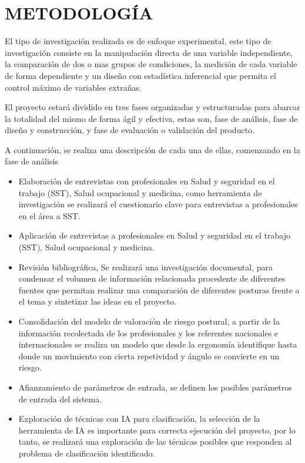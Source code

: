\chapter{METODOLOGÍA}

El tipo de investigación realizada es de enfoque experimental, este tipo de investigación consiste en la manipulación directa de una variable independiente, la comparación de dos o mas grupos de condiciones, la medición de cada variable de forma dependiente y un diseño con estadística inferencial que permita el control máximo de variables extrañas.\parencite{MoroneMetodosCientifica}

El proyecto estará dividido en tres fases organizadas y estructuradas para abarcar la totalidad del mismo de forma ágil y efectiva, estas son, fase de análisis, fase de diseño y construcción, y fase de evaluación o validación del producto.

A continuación, se realiza una descripción de cada una de ellas, comenzando en la fase de análisis 
\begin{itemize}
\item Elaboración de entrevistas con profesionales en Salud y seguridad en el trabajo (SST), Salud ocupacional y medicina, como herramienta de investigación se realizará el cuestionario clave para entrevistas a profesionales en el área a SST.
\item Aplicación de entrevistas a profesionales en Salud y seguridad en el trabajo (SST), Salud ocupacional y medicina.
\item Revisión bibliográfica, Se realizará una investigación documental, para condensar el volumen de información relacionada procedente de diferentes fuentes que permitan realizar una comparación de diferentes posturas frente a el tema y sintetizar las ideas en el proyecto. 
\item Consolidación del modelo de valoración de riesgo postural, a partir de la información recolectada de los profesionales y los referentes nacionales e internacionales se realiza un modelo que desde la ergonomía identifique hasta donde un movimiento con cierta repetividad y ángulo se convierte en un riesgo. 
\item Afianzamiento de parámetros de entrada, se definen los posibles parámetros de entrada del sistema.
\item Exploración de técnicas con IA para clasificación, la selección de la herramienta de IA es importante para correcta ejecución del proyecto, por lo tanto, se realizará una exploración de las técnicas posibles que responden al problema de clasificación identificado. 

\end{itemize}

